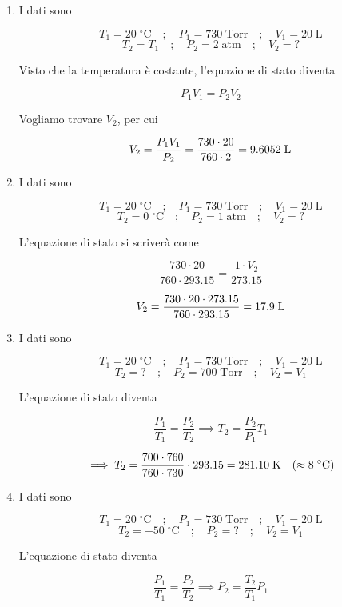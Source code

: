 \begin{soluzione}
    \begin{enumerate}
        \item I dati sono

    $$T_1=20 \; ^{\circ}\text{C}
    \quad;\quad
    P_1=730 \; \text{Torr}
    \quad;\quad
    V_1=20 \; \text{L}$$
    $$T_2=T_1
    \quad;\quad
    P_2=2 \; \text{atm}
    \quad;\quad
    V_2=?$$
    
    Visto che la temperatura è costante, l'equazione di stato diventa
    
    $$P_1V_1=P_2V_2$$
    
    Vogliamo trovare $V_2$, per cui
    
    $$V_2=\frac{P_1V_1}{P_2}
    =\frac{730 \cdot 20}{760 \cdot 2}=9.6052 \; \rm L$$
    \item I dati sono

    $$T_1=20 \; ^{\circ}\text{C}
    \quad;\quad
    P_1=730 \; \text{Torr}
    \quad;\quad
    V_1=20 \; \text{L}$$
    $$T_2=0 \; ^{\circ}\text{C}
    \quad;\quad
    P_2=1 \; \text{atm}
    \quad;\quad
    V_2=?$$
    
    L'equazione di stato si scriverà come
    
    $$\frac{730 \cdot 20}{760 \cdot 293.15}=\frac{1 \cdot V_2}{273.15}$$
    
    $$V_2=\frac{730 \cdot 20 \cdot 273.15}{760 \cdot 293.15}=17.9 \; \rm L$$
    \item I dati sono

    $$T_1=20 \; ^{\circ}\text{C}
    \quad;\quad
    P_1=730 \; \text{Torr}
    \quad;\quad
    V_1=20 \; \text{L}$$
    $$T_2=?
    \quad;\quad
    P_2=700 \; \text{Torr}
    \quad;\quad
    V_2=V_1$$
    
    L'equazione di stato diventa
    
    $$\frac{P_1}{T_1}=\frac{P_2}{T_2}
    \implies
    T_2=\frac{P_2}{P_1}T_1$$
    
    $$\implies
    T_2=\frac{700 \cdot 760}{760 \cdot 730}\cdot 293.15
    =281.10 \; \rm K
    \quad(\approx 8 \; ^{\circ}C)$$
    \item I dati sono 

    $$T_1=20 \; ^{\circ}\text{C}
    \quad;\quad
    P_1=730 \; \text{Torr}
    \quad;\quad
    V_1=20 \; \text{L}$$
    $$T_2=-50 \; ^{\circ}\text{C}
    \quad;\quad
    P_2=?
    \quad;\quad
    V_2=V_1$$
    
    L'equazione di stato diventa
    
    $$\frac{P_1}{T_1}=\frac{P_2}{T_2}
    \implies
    P_2=\frac{T_2}{T_1}P_1$$
    

\end{enumerate}
\end{soluzione}
